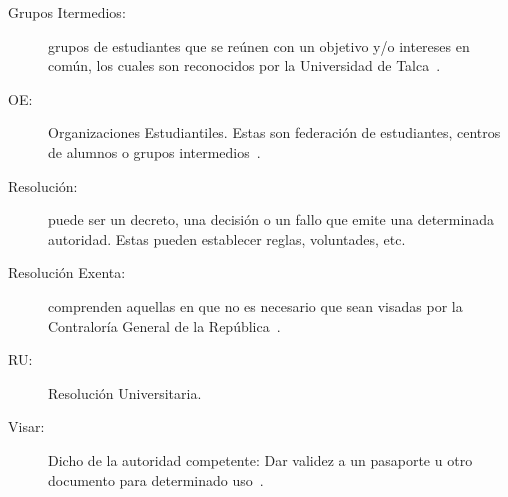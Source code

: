 \begin{glosario}
	\item 	\begin{description}
			\item[Grupos Itermedios:] grupos de estudiantes que se reúnen con un objetivo y/o intereses en común, los cuales son reconocidos por la Universidad de Talca~\cite{18}.
		\end{description}

	\item 	\begin{description}
			\item[OE:] Organizaciones Estudiantiles. Estas son federación de estudiantes, centros de alumnos o grupos intermedios~\cite{2}.
		\end{description}

	\item 	\begin{description}
			\item[Resolución:] puede ser un decreto, una decisión o un fallo que emite una determinada autoridad. Estas pueden establecer reglas, voluntades, etc.
		\end{description}
	
	\item 	\begin{description}
			\item[Resolución Exenta:] comprenden aquellas en que no es necesario que sean visadas por la Contraloría General de la República~\cite{3}.
		\end{description}
	
	\item 	\begin{description}
			\item[RU:] Resolución Universitaria.
		\end{description}

	\item 	\begin{description}
			    \item[Visar:] Dicho de la autoridad competente: Dar validez a un pasaporte u otro documento para determinado uso~\cite{4}.
			\end{description} 

\end{glosario}
